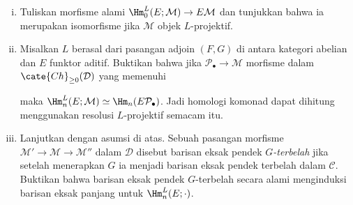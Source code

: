 	\begin{enumerate}[(i)]
		\item Tuliskan morfisme alami
		$\Hm^L_0(E;\mathcal{M})\to E\mathcal{M}$ dan tunjukkan bahwa ia
		merupakan isomorfisme jika $\mathcal{M}$ objek $L$-projektif.
		\item Misalkan $L$ berasal dari pasangan adjoin $(F,G)$ di antara
		kategori abelian dan $E$ funktor aditif. Buktikan bahwa jika
		$\mathcal{P}_\bullet\to\mathcal{M}$ morfisme dalam
		$\cate{Ch}_{\geq0}(\mathcal{D})$ yang memenuhi
		maka
		$\Hm^L_n(E;\mathcal{M})\simeq\Hm_n(E\mathcal{P}_\bullet)$.
		Jadi homologi komonad dapat dihitung menggunakan resolusi
		$L$-projektif semacam itu.
		\item Lanjutkan dengan asumsi di atas. Sebuah pasangan morfisme
		$\mathcal{M}'\to\mathcal{M}\to\mathcal{M}''$ dalam $\mathcal{D}$
		disebut barisan eksak pendek \emph{$G$-terbelah} jika setelah
		menerapkan $G$ ia menjadi barisan eksak pendek terbelah dalam
		$\mathcal{C}$. Buktikan bahwa barisan eksak pendek $G$-terbelah
		secara alami menginduksi barisan eksak panjang untuk
		$\Hm^L_n(E;\mathord\cdot)$.
	\end{enumerate}


